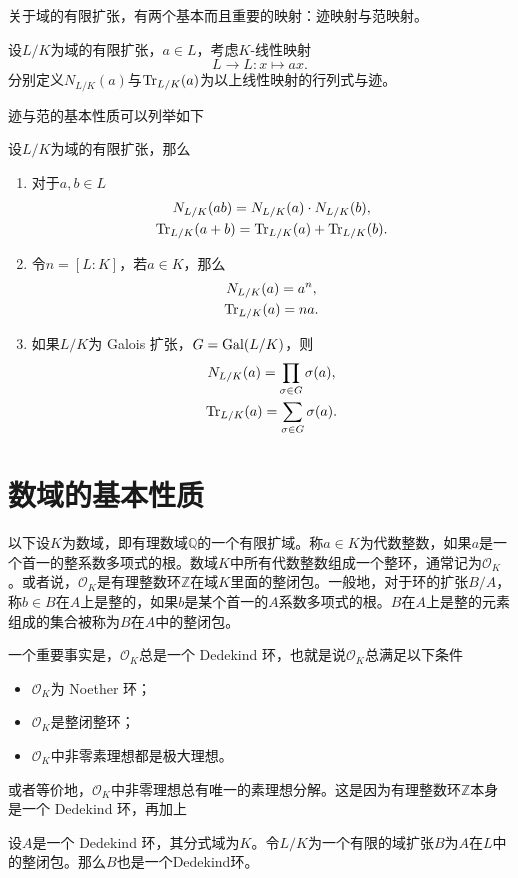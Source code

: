 关于域的有限扩张，有两个基本而且重要的映射：迹映射与范映射。

\begin{definition}
设$L/K$为域的有限扩张，$a\in L$，考虑$K$-线性映射
\[L \longrightarrow L: x\mapsto ax.\]
分别定义$N_{L/K}(a)$与$\operatorname{Tr}_{L/K}(a)$为以上线性映射的行列式与迹。
\end{definition}

迹与范的基本性质可以列举如下

\begin{proposition}
设$L/K$为域的有限扩张，那么
\begin{enumerate}
\item 对于$a,b\in L$
\begin{gather}
N_{L/K}(ab) = N_{L/K}(a)\cdot N_{L/K}(b), \\
\operatorname{Tr}_{L/K}(a+b) = \operatorname{Tr}_{L/K}(a) + \operatorname{Tr}_{L/K}(b).
\end{gather}
\item 令$n = [L:K]$，若$a\in K$，那么
\begin{gather}
N_{L/K}(a) = a^n, \\
\operatorname{Tr}_{L/K}(a) = na.
\end{gather}
\item 如果$L/K$为 Galois 扩张，$G = \operatorname{Gal}(L/K)$，则
\begin{gather}
N_{L/K}(a) = \prod\limits_{\sigma\in G} \sigma(a), \\
\operatorname{Tr}_{L/K}(a) = \sum\limits_{\sigma\in G} \sigma(a).
\end{gather}
\end{enumerate}
\end{proposition}

\section{数域的基本性质}
以下设$K$为数域，即有理数域$\mathbb{Q}$的一个有限扩域。称$a\in K$为代数整数，如果$a$是一个首一的整系数多项式的根。数域$K$中所有代数整数组成一个整环，通常记为$\mathcal{O}_K$。或者说，$\mathcal{O}_K$是有理整数环$\mathbb{Z}$在域$K$里面的整闭包。一般地，对于环的扩张$B/A$，称$b\in B$在$A$上是整的，如果$b$是某个首一的$A$系数多项式的根。$B$在$A$上是整的元素组成的集合被称为$B$在$A$中的整闭包。


一个重要事实是，$\mathcal{O}_K$总是一个 Dedekind 环，也就是说$\mathcal{O}_K$总满足以下条件
\begin{itemize}
\item $\mathcal{O}_K$为 Noether 环；
\item $\mathcal{O}_K$是整闭整环；
\item $\mathcal{O}_K$中非零素理想都是极大理想。
\end{itemize}
或者等价地，$\mathcal{O}_K$中非零理想总有唯一的素理想分解。这是因为有理整数环$\mathbb{Z}$本身是一个 Dedekind 环，再加上
\begin{theorem}
设$A$是一个 Dedekind 环，其分式域为$K$。令$L/K$为一个有限的域扩张$B$为$A$在$L$中的整闭包。那么$B$也是一个Dedekind环。
\end{theorem}

